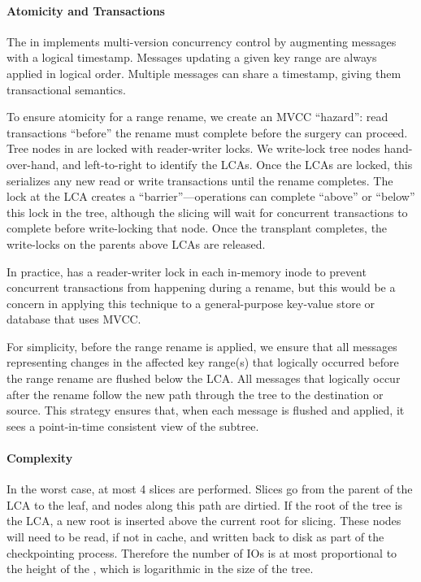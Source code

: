 \paragraph{Atomicity and Transactions}
The \bet in \betrfs implements multi-version concurrency control by augmenting
messages with a logical timestamp.
Messages updating a given key range are always applied in logical order.
Multiple messages can share a timestamp, giving them transactional semantics.

To ensure atomicity for a range rename, we create an MVCC ``hazard'':
read transactions ``before'' the rename must complete before the surgery
can proceed.
Tree nodes in \betrfs  are locked with reader-writer locks.
We write-lock tree nodes hand-over-hand, and left-to-right to identify
the LCAs.  Once the LCAs are locked, this serializes any new read or write
transactions until the rename completes.  The lock at the LCA creates
a ``barrier''---operations can complete ``above'' or ``below'' this lock
in the tree, although the slicing will wait for concurrent
transactions to complete before write-locking that node. Once the transplant
completes, the write-locks on the parents above LCAs are released.

In practice, \betrfs has a reader-writer lock in each in-memory inode to prevent
concurrent transactions from happening during a rename,
but this would be a concern in applying this technique to a general-purpose
key-value store or database that uses MVCC.

For simplicity, before the range rename is applied, we ensure that all messages
representing changes in the affected key range(s) that logically occurred before
the range rename are flushed below the LCA.
All messages that logically occur after the rename follow the new path through
the tree to the destination or source.
This strategy ensures that, when each message is flushed and applied, it sees a
point-in-time consistent view of the subtree.

\paragraph{Complexity} In the worst case, at most 4 slices are performed.
Slices go from the parent of the LCA to the leaf,
and nodes along this path are dirtied.
If the root of the tree is the LCA, a new root is inserted above the current
root for slicing.
These nodes will need to be read, if not in cache,
and written back to disk as part of the checkpointing process.
Therefore the number of IOs is at most proportional to the height of the \bet,
which is logarithmic in the size of the tree.

